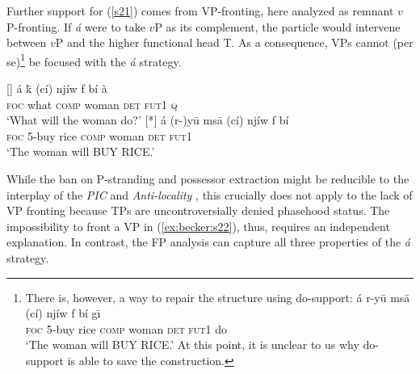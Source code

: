 \documentclass[output=paper,
modfonts
]{langscibook}
\begin{document}
Further support for (\ref{s21}) comes from VP-fronting, here analyzed as remnant $v$P-fronting. If {\em \'a} were to take $v$P as its complement, the particle would intervene between $v$P and the higher functional head T. As a consequence, VPs cannot (per se)\footnote{There is, however, a way to repair the structure using do-support:
\ea
\gll \'a {r-y\=u} {ms\=a} (c\'i) nj\'iw f b\'i {g\={\i}} \\ \textsc{foc} {{5}-buy} {rice} \textsc{comp} woman \textsc{det} \textsc{fut1} {do} \\ 
\glt `The woman will BUY RICE.'
\z
At this point, it is unclear to us why do-support is able to save the construction. %
} be focused with the {\em \'a} strategy.
\begin{exe}
\ex \label{ex:becker:s22}
	\begin{xlist}
		[]{ 
			\gll \'a k\=\textepsilon{} (c\'i) nj\'iw f b\'i \`a \\ 
			\textsc{foc} what \textsc{comp} woman \textsc{det} \textsc{fut1} \textsc{q}\\ 
			\glt `What will the woman do?'}
		[*]{ 
			\gll \'a {(r-)y\=u} {ms\=a} (c\'i) nj\'iw f b\'i \\ 
			\textsc{foc} 5-buy {rice} \textsc{comp} woman \textsc{det} \textsc{fut1}\\ 
			\glt `The woman will BUY RICE.'}
	\end{xlist}
\end{exe}
While the ban on P-stranding and possessor extraction might be reducible to the interplay of the {\em PIC} \citep{Chomsky2000} and {\em Anti-locality} \citep{Abels2003,Erlewine2016}, this crucially does not apply to the lack of VP fronting because TPs are uncontroversially denied phasehood status. The impossibility to front a VP in (\ref{ex:becker:s22}), thus, requires an independent explanation. In contrast, the FP analysis can capture all three properties of the {\em \'a} strategy.
\end{document}
